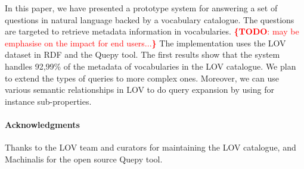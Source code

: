 \documentclass[runningheads,a4paper]{llncs}
\newcommand{\todo}[1]{\noindent\textcolor{red}{{\bf \{TODO}: #1{\bf \}}}}
\begin{document}
In this paper, we have presented a prototype system for answering a set of questions in natural language backed by a vocabulary catalogue. The questions are targeted to retrieve metadata information in vocabularies. \todo{may be emphasise on the impact for end users...}
The implementation uses the LOV dataset in RDF and the Quepy tool. The first results show that the system handles 92,99\% of the metadata of vocabularies in the LOV catalogue.
We plan to extend the types of queries to more complex ones. Moreover, we can use various semantic relationships in LOV to do query expansion by using for instance sub-properties. 


\paragraph{\textbf{Acknowledgments}} %
Thanks to the LOV team and curators for maintaining the LOV catalogue, and Machinalis for the open source Quepy tool. 




\end{document}
